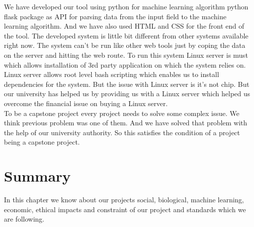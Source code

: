 We have developed our tool using python for machine learning algorithm python flask package as API for parsing data from the input field to the machine learning algorithm. And we have also used HTML and CSS for the front end of the tool. The developed system is little bit different from other systems available right now. The system can't be run like other web tools just by coping the data on the server and hitting the web route. To run this system Linux server is must which allows installation of 3rd party application on which the system relies on. Linux server allows root level bash scripting which enables us to install dependencies for the system. But the issue with Linux server is it's not chip. But our university has helped us by providing us with a Linux server which helped us overcome the financial issue on buying a Linux server.\\
To be a capstone project every project needs to solve some complex issue. We think previous problem was one of them. And we have solved that problem with the help of our university authority. So this satisfies the condition of a project being a capstone project.

\section{Summary}

In this chapter we know about our projects social, biological, machine learning, economic, ethical impacts and constraint of our project and standards which we are following.


